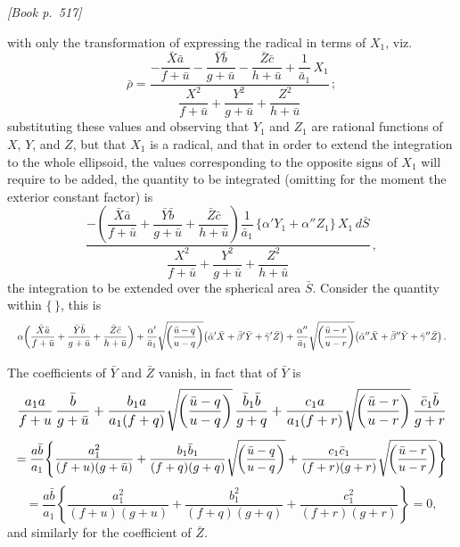 \documentclass[11pt]{article}
\begin{document}
\medskip
\noindent\textit{[Book p.~517]}\hfill

\smallskip

\noindent with only the transformation of expressing the radical in terms of $X_{1}$, viz.\
\[
\bar{\rho} = \frac{-\dfrac{\bar{X}\bar{a}}{f + \bar{u}} - \dfrac{\bar{Y}\bar{b}}{g + \bar{u}} - \dfrac{\bar{Z}\bar{c}}{h + \bar{u}} + \dfrac{1}{\bar{a}_{1}}\, X_{1}}{\dfrac{X^{2}}{f + \bar{u}} + \dfrac{Y^{2}}{g + \bar{u}} + \dfrac{Z^{2}}{h + \bar{u}}}\,;
\]
substituting these values and observing that $Y_{1}$ and $Z_{1}$ are rational functions of $X$, $Y$, and $Z$, but that $X_{1}$ is a radical, and that in order to extend the integration to the whole ellipsoid, the values corresponding to the opposite signs of $X_{1}$ will require to be added, the quantity to be integrated (omitting for the moment the exterior constant factor) is
\[
\dfrac{-\!\left(\dfrac{\bar{X}\bar{a}}{f + \bar{u}} + \dfrac{\bar{Y}\bar{b}}{g + \bar{u}} + \dfrac{\bar{Z}\bar{c}}{h + \bar{u}}\right) \dfrac{1}{\bar{a}_{1}}\,\{\alpha' Y_{1} + \alpha'' Z_{1}\}\, X_{1}\, d\bar{S}}{\dfrac{X^{2}}{f + \bar{u}} + \dfrac{Y^{2}}{g + \bar{u}} + \dfrac{Z^{2}}{h + \bar{u}}}\,,
\]
the integration to be extended over the spherical area $\bar{S}$. Consider the quantity within $\{\,\}$, this is
\[ \resizebox{\textwidth}{!}{$\displaystyle
\alpha\!\left(\dfrac{\bar{X}\bar{a}}{f + \bar{u}} + \dfrac{\bar{Y}\bar{b}}{g + \bar{u}} + \dfrac{\bar{Z}\bar{c}}{h + \bar{u}}\right) + \dfrac{\alpha'}{\bar{a}_{1}}\sqrt{\!\left(\dfrac{\bar{u} - q}{u - q}\right)}\!\left(\bar{\alpha}'\bar{X} + \bar{\beta}'\bar{Y} + \bar{\gamma}'\bar{Z}\right) + \dfrac{\alpha''}{\bar{a}_{1}}\sqrt{\!\left(\dfrac{\bar{u} - r}{u - r}\right)}\!\left(\bar{\alpha}''\bar{X} + \bar{\beta}''\bar{Y} + \bar{\gamma}''\bar{Z}\right).
$} \]

The coefficients of $\bar{Y}$ and $\bar{Z}$ vanish, in fact that of $\bar{Y}$ is
\[ \resizebox{\textwidth}{!}{$\displaystyle
\frac{a_{1} a}{f + u}\,\frac{\bar{b}}{g + \bar{u}} + \frac{b_{1} a}{a_{1}(f + q)}\sqrt{\!\left(\frac{\bar{u} - q}{u - q}\right)}\,\frac{\bar{b}_{1} \bar{b}}{g + q} + \frac{c_{1} a}{a_{1}(f + r)}\sqrt{\!\left(\frac{\bar{u} - r}{u - r}\right)}\,\frac{\bar{c}_{1} \bar{b}}{g + r}
$} \]
\[ \resizebox{\textwidth}{!}{$\displaystyle
= \frac{a \bar{b}}{a_{1}}\!\left\{\frac{a_{1}^{2}}{(f + u)(g + \bar{u})} + \frac{b_{1} \bar{b}_{1}}{(f + q)(g + q)}\sqrt{\!\left(\frac{\bar{u} - q}{u - q}\right)} + \frac{c_{1} \bar{c}_{1}}{(f + r)(g + r)}\sqrt{\!\left(\frac{\bar{u} - r}{u - r}\right)}\right\}
$} \]
\[
= \frac{a \bar{b}}{a_{1}}\!\left\{\frac{a_{1}^{2}}{(f + u)(g + u)} + \frac{b_{1}^{2}}{(f + q)(g + q)} + \frac{c_{1}^{2}}{(f + r)(g + r)}\right\} = 0,
\]
and similarly for the coefficient of $\bar{Z}$.
\end{document}
